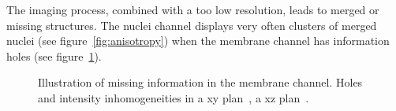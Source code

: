 The imaging process, combined with a too low resolution, leads to merged or missing structures.
The nuclei channel displays very often clusters of merged nuclei (see figure~\ref{fig:anisotropy})
when the membrane channel has information holes (see figure~\ref{fig:holesMembrane}).

\begin{figure}[htb]
  \centering
  \captionsetup[subfloat]{labelformat=empty}
  \hspace{5pt}
\caption{%
Illustration of missing information in the membrane channel. Holes and intensity inhomogeneities in a xy plan~, a xz plan~.}
\label{fig:holesMembrane}
\end{figure}



